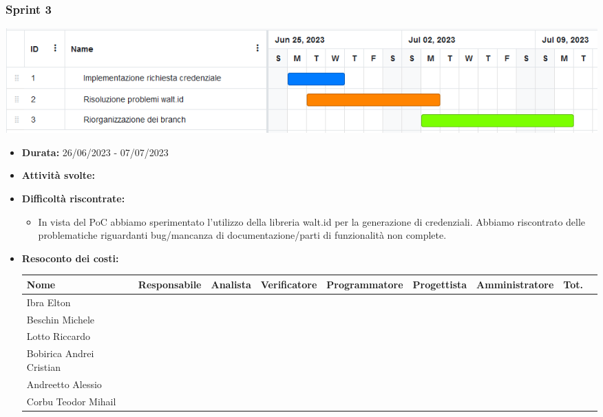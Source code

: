 \subsubsection{Sprint 3}
\begin{center}
    \includegraphics[scale = 0.5]{./res/img/Sprint_3.png}
  \end{center}
\begin{itemize}
    \item \textbf{Durata:} 26/06/2023 - 07/07/2023 
    \item \textbf{Attività svolte:} 
    \item \textbf{Difficoltà riscontrate:}
    \begin{itemize}
        \item In vista del PoC abbiamo sperimentato l’utilizzo della libreria walt.id per la generazione di credenziali.
        Abbiamo riscontrato delle problematiche riguardanti bug/mancanza di documentazione/parti di funzionalità non complete.
    \end{itemize}
    \item \textbf{Resoconto dei costi:}
    \begin{longtable}{|p{}|c|c|c|c|c|c|c|c|}
        \hline
        Nome & Responsabile & Analista & Verificatore & Programmatore & Progettista & Amministratore & Tot.\\
        \hline
        Ibra Elton & & & & & & &\\
        \hline
        Beschin Michele & & & & & & & \\
        \hline
        Lotto Riccardo & & & & & & & \\
        \hline
        Bobirica Andrei Cristian & & & & & & & \\
        \hline
        Andreetto Alessio & & & & & & & \\
        \hline
        Corbu Teodor Mihail & & & & & & & \\
        \hline
    \end{longtable}
    \end{itemize}

